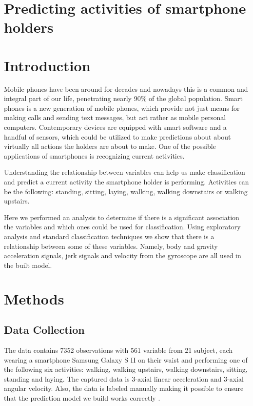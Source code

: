 \documentclass[a4paper,12pt]{extarticle}
\begin{document}
\section*{Predicting activities of smartphone holders}

\section{Introduction}

Mobile phones have been around for decades and nowadays this is a common and integral part of our life, penetrating nearly 90\% of the global population. \cite{sourse:wiki.mobile.phones} Smart phones is a new generation of mobile phones, which provide not just means for making calls and sending text messages, but act rather as mobile personal computers. Contemporary devices are equipped with smart software and a handful of sensors, which could be utilized to make predictions about about virtually all actions the holders are about to make. One of the possible applications of smartphones is recognizing current activities.

Understanding the relationship between variables can help us make classification and predict a current activity the smartphone holder is performing. Activities can be the following: standing, sitting, laying, walking, walking downstairs or walking upstairs.

Here we performed an analysis to determine if there is a significant association the variables and which ones could be used for classification. Using exploratory analysis and standard classification techniques we show that there is a relationship between some of these variables. Namely, body and gravity acceleration signals, jerk signals and velocity from the gyroscope are all used in the built model. 


\section{Methods}

\subsection{Data Collection}

The data contains 7352 observations with 561 variable from 21 subject, each wearing a smartphone Samsung Galaxy S II on their waist and performing one of the following six activities: walking, walking upstairs, walking downstairs, sitting, standing and laying. The captured data is 3-axial linear acceleration and 3-axial angular velocity. Also, the data is labeled manually making it possible to ensure that the prediction model we build works correctly \cite{source:machineleariningrepo}. 
\end{document}
